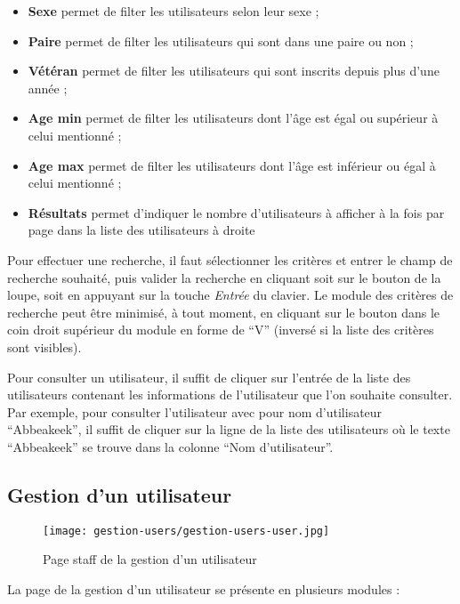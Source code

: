 \begin{itemize}
\item \textbf{Sexe} permet de filter les utilisateurs selon leur sexe ;
\item \textbf{Paire} permet de filter les utilisateurs qui sont dans une paire ou non ;
\item \textbf{Vétéran} permet de filter les utilisateurs qui sont inscrits depuis plus d'une année ;
\item \textbf{Age min} permet de filter les utilisateurs dont l'âge est égal ou supérieur à celui mentionné ;
\item \textbf{Age max} permet de filter les utilisateurs dont l'âge est inférieur ou égal à celui mentionné ;
\item \textbf{Résultats} permet d'indiquer le nombre d'utilisateurs à afficher à la fois par page dans la liste des utilisateurs à droite
\end{itemize}
\bigskip

Pour effectuer une recherche, il faut sélectionner les critères et entrer le champ de recherche souhaité, puis valider la recherche en cliquant soit sur le bouton de la loupe, soit en appuyant sur la touche \textit{Entrée} du clavier. Le module des critères de recherche peut être minimisé, à tout moment, en cliquant sur le bouton dans le coin droit supérieur du module en forme de \enquote{V} (inversé si la liste des critères sont visibles).\newline

Pour consulter un utilisateur, il suffit de cliquer sur l'entrée de la liste des utilisateurs contenant les informations de l'utilisateur que l'on souhaite consulter. Par exemple, pour consulter l'utilisateur avec pour nom d'utilisateur \enquote{Abbeakeek}, il suffit de cliquer sur la ligne de la liste des utilisateurs où le texte \enquote{Abbeakeek} se trouve dans la colonne \enquote{Nom d'utilisateur}.

\subsection{Gestion d'un utilisateur}

\begin{figure}[H]
\centering
\texttt{[image: gestion-users/gestion-users-user.jpg]}
\caption{Page staff de la gestion d'un utilisateur}
\end{figure}

La page de la gestion d'un utilisateur se présente en plusieurs modules :

